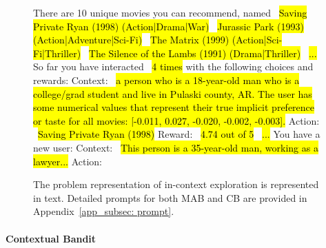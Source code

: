 \begin{figure}[h]
\begin{minipage}[t]{0.63\textwidth}
\begin{tcolorbox} \newline
  There are 10 unique movies you can recommend, named \newline 
     ~\hl{Saving Private Ryan (1998) (Action|Drama|War)} \newline 
     ~\hl{Jurassic Park (1993) (Action|Adventure|Sci-Fi)} \newline
     ~\hl{The Matrix (1999) (Action|Sci-Fi|Thriller)} \newline 
     ~\hl{The Silence of the Lambs (1991) (Drama|Thriller)} \newline
      ~\hl{...} \newline
    So far you have interacted ~\hl{4 times} with the following choices and rewards: \newline
    Context: ~\hl{a person who is a 18-year-old man who is a college/grad student and live in Pulaski county, AR. The user has some numerical values that represent their true implicit preference or taste for all movies: [-0.011, 0.027, -0.020, -0.002, -0.003].} \newline
    Action: ~\hl{Saving Private Ryan (1998)} \newline
    Reward: ~\hl{4.74 out of 5} \newline 
    ~\hl{...} \newline 
    You have a new user: \newline 
    Context: ~\hl{This person is a 35-year-old man, working as a lawyer...}\newline 
    Action:
    \end{tcolorbox}
\end{minipage}%
    \caption{\footnotesize{The problem representation of in-context exploration is represented in text. Detailed prompts for both MAB and CB are provided in Appendix~\ref{app_subsec: prompt}.}}
    \label{fig:mab_cb_prompt}
\end{figure}


\paragraph{Contextual Bandit}

